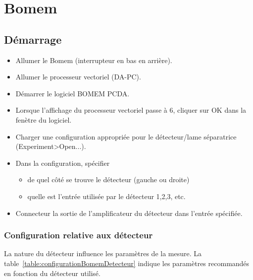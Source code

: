 \documentclass[11pt,francais]{book} %
\begin{document}
\section{Bomem}

\subsection{Démarrage}

\begin{itemize}
\item Allumer le Bomem (interrupteur en bas en arrière).
\item Allumer le processeur vectoriel (DA-PC).
\item Démarrer le logiciel BOMEM PCDA.
\item Lorsque l'affichage du processeur vectoriel passe à 6, cliquer sur OK dans la fenètre du logiciel.
\item Charger une configuration appropriée pour le détecteur/lame séparatrice (Experiment>Open...).
\item Dans la configuration, spécifier
  \begin{itemize}
    \item de quel côté se trouve le détecteur (gauche ou droite)
    \item quelle est l'entrée utilisée par le détecteur 1,2,3, etc.
  \end{itemize}
\item Connecteur la sortie de l'amplificateur du détecteur dans l'entrée spécifiée.
\end{itemize}

\subsubsection{Configuration relative aux détecteur}

La nature du détecteur influence les paramètres de la mesure.
La table~\ref{table:configurationBomemDetecteur} indique les paramètres recommandés en fonction du détecteur utilisé.
\end{document}
